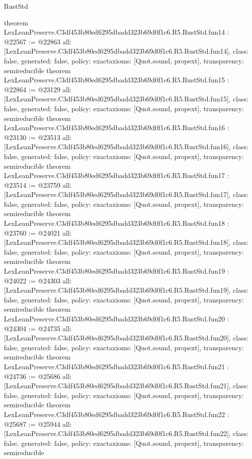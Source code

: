 \begin{lexlean}{RustStd}
\begin{coremodule}
{}
theorem LexLeanPreserve.C3df453b80ed6295dbadd323b69d0f1c6.R5.RustStd.fun14 : @22567 := @22863 {
  all: [LexLeanPreserve.C3df453b80ed6295dbadd323b69d0f1c6.R5.RustStd.fun14],
  class: false,
  generated: false,
  policy: exact{axioms: [Quot.sound, propext]},
  transparency: semireducible
}
theorem LexLeanPreserve.C3df453b80ed6295dbadd323b69d0f1c6.R5.RustStd.fun15 : @22864 := @23129 {
  all: [LexLeanPreserve.C3df453b80ed6295dbadd323b69d0f1c6.R5.RustStd.fun15],
  class: false,
  generated: false,
  policy: exact{axioms: [Quot.sound, propext]},
  transparency: semireducible
}
theorem LexLeanPreserve.C3df453b80ed6295dbadd323b69d0f1c6.R5.RustStd.fun16 : @23130 := @23513 {
  all: [LexLeanPreserve.C3df453b80ed6295dbadd323b69d0f1c6.R5.RustStd.fun16],
  class: false,
  generated: false,
  policy: exact{axioms: [Quot.sound, propext]},
  transparency: semireducible
}
theorem LexLeanPreserve.C3df453b80ed6295dbadd323b69d0f1c6.R5.RustStd.fun17 : @23514 := @23759 {
  all: [LexLeanPreserve.C3df453b80ed6295dbadd323b69d0f1c6.R5.RustStd.fun17],
  class: false,
  generated: false,
  policy: exact{axioms: [Quot.sound, propext]},
  transparency: semireducible
}
theorem LexLeanPreserve.C3df453b80ed6295dbadd323b69d0f1c6.R5.RustStd.fun18 : @23760 := @24021 {
  all: [LexLeanPreserve.C3df453b80ed6295dbadd323b69d0f1c6.R5.RustStd.fun18],
  class: false,
  generated: false,
  policy: exact{axioms: [Quot.sound, propext]},
  transparency: semireducible
}
theorem LexLeanPreserve.C3df453b80ed6295dbadd323b69d0f1c6.R5.RustStd.fun19 : @24022 := @24303 {
  all: [LexLeanPreserve.C3df453b80ed6295dbadd323b69d0f1c6.R5.RustStd.fun19],
  class: false,
  generated: false,
  policy: exact{axioms: [Quot.sound, propext]},
  transparency: semireducible
}
theorem LexLeanPreserve.C3df453b80ed6295dbadd323b69d0f1c6.R5.RustStd.fun20 : @24304 := @24735 {
  all: [LexLeanPreserve.C3df453b80ed6295dbadd323b69d0f1c6.R5.RustStd.fun20],
  class: false,
  generated: false,
  policy: exact{axioms: [Quot.sound, propext]},
  transparency: semireducible
}
theorem LexLeanPreserve.C3df453b80ed6295dbadd323b69d0f1c6.R5.RustStd.fun21 : @24736 := @25686 {
  all: [LexLeanPreserve.C3df453b80ed6295dbadd323b69d0f1c6.R5.RustStd.fun21],
  class: false,
  generated: false,
  policy: exact{axioms: [Quot.sound, propext]},
  transparency: semireducible
}
theorem LexLeanPreserve.C3df453b80ed6295dbadd323b69d0f1c6.R5.RustStd.fun22 : @25687 := @25944 {
  all: [LexLeanPreserve.C3df453b80ed6295dbadd323b69d0f1c6.R5.RustStd.fun22],
  class: false,
  generated: false,
  policy: exact{axioms: [Quot.sound, propext]},
  transparency: semireducible
}
\end{coremodule}
\end{lexlean}
